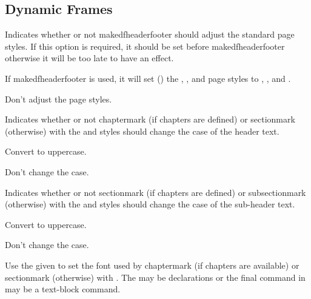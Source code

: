 \documentclass[fontsize=12pt]{scrbook}
\begin{document}
\subsection{Dynamic Frames}
\label{sec:pkgoptsdynamic}


Indicates whether or not \gls{makedfheaderfooter} should 
adjust the standard page styles. If this option is required, it should be set
before \gls{makedfheaderfooter} otherwise it will be too late to
have an effect.


If \gls{makedfheaderfooter} is used, it will set () the
, ,  and
 page styles to ,
,  and .


Don't adjust the page styles.


Indicates whether or not \gls{chaptermark} (if chapters are
defined) or \gls{sectionmark} (otherwise) with the  and
 styles should change the case of the header
text.


Convert to uppercase.


Don't change the case.


Indicates whether or not \gls{sectionmark} (if chapters are
defined) or \gls{subsectionmark} (otherwise) with the  and
 styles should change the case of the sub-header
text.


Convert to uppercase.


Don't change the case.


Use the given  to set the font used by
\gls{chaptermark} (if chapters are available) or \gls{sectionmark}
(otherwise) with . The  may be
declarations or the final command in  may be a text-block
command.
\end{document}
